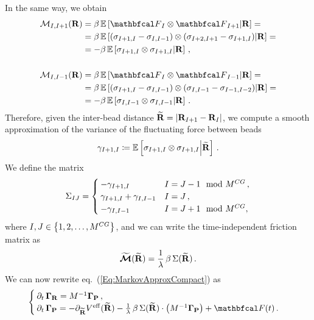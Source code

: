 \documentclass[10pt,a4paper]{book}
\theoremstyle{definition}
\begin{document}
\noindent
In the same way, we obtain
\begin{align*}
 \fricmat_{I,I+1}(\bfR) &= \beta\,\cexpval{\fprojbf_I \otimes \fprojbf_{I+1}}{\bfR} = \\
 &= \beta\,\cexpval{ (\sigma_{I+1,I}-\sigma_{I,I-1}) \otimes (\sigma_{I+2,I+1}-\sigma_{I+1,I}) }{\bfR} = \\
 &= -\beta\,\cexpval{ \sigma_{I+1,I} \otimes \sigma_{I+1,I} }{\bfR} \,, \\
 \\
 \fricmat_{I,I-1}(\bfR) &= \beta\,\cexpval{\fprojbf_I \otimes \fprojbf_{I-1}}{\bfR} = \\
 &= \beta\,\cexpval{ (\sigma_{I+1,I}-\sigma_{I,I-1}) \otimes (\sigma_{I,I-1}-\sigma_{I-1,I-2}) }{\bfR} = \\
 &= -\beta\,\cexpval{ \sigma_{I,I-1} \otimes \sigma_{I,I-1} }{\bfR} \,.
\end{align*}
Therefore, given the inter-bead distance $\widetilde{\mathbf{R}}=\lvert\mathbf{R}_{I+1}-\mathbf{R}_{I}\rvert$, we compute a smooth approximation of the variance of the fluctuating force between beads
\[
 \gamma_{I+1,I} \coloneqq \mathbb{E}\left[ { \sigma_{I+1,I} \otimes \sigma_{I+1,I} } \middle\vert { \widetilde{\mathbf{R}} } \right]\,.
\]
We define the matrix
\begin{equation*}
 \Sigma_{IJ} = \begin{cases}
    -\gamma_{I+1,I} & I=J-1 \mod {M^{CG}} \,, \\
    \gamma_{I+1,I} + \gamma_{I,I-1} & I=J \,, \\
    -\gamma_{I,I-1} & I=J+1 \mod {M^{CG}},
 \end{cases}
\end{equation*}
where $I,J \in \left\lbrace 1,2,\dots,M^{CG}\right\rbrace$, and we can write the time-independent friction matrix as 
\begin{equation}
\label{Eq:TridMat}
 \widetilde{\boldsymbol{\mathcal{M}}}(\widetilde{\mathbf{R}}) = \frac{1}{\lambda}\,\beta\,\Sigma(\widetilde{\mathbf{R}})\,.
\end{equation}
We can now rewrite eq.~(\ref{Eq:MarkovApproxCompact}) as
\begin{equation}
\label{Eq:MApCompactTrMat}
\begin{cases}
 \partial_t\,\Bphase{\bfR} = M^{-1}\Bphase{\bfP} \,, & \\
 \partial_t\,\Bphase{\bfP} = -\partial_{\widetilde{\bfR}}\Veff(\widetilde{\bfR}) 
                             - \frac{1}{\lambda}\, \beta\,\Sigma(\widetilde{\bfR}) \cdot \cip{M^{-1}\Bphase{\bfP}}
                             + \fprojbf(t) \,. &  
\end{cases}
\end{equation} 
\end{document}
